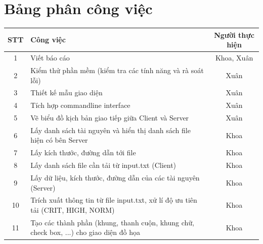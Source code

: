 \documentclass[a4paper,12pt]{report}
\begin{document}
\section{Bảng phân công việc}
\begin{center}
  \renewcommand{\arraystretch}{1.5}
  \begin{tabular}{|c|p{}|c|}
    \hline
    \textbf{STT} & \textbf{Công việc}                                                                                         & \textbf{Người thực hiện} \\\hline
    1            & Viết báo cáo                                                                             & Khoa, Xuân               \\\hline
    2            & Kiểm thử phần mềm (kiểm tra các tính năng và rà soát lỗi)                                     & Xuân               \\\hline
    3            & Thiết kế mẫu giao diện                                                                         & Xuân               \\\hline
    4            & Tích hợp commandline interface                                                                & Xuân               \\\hline
    5            & Vẽ biểu đồ kịch bản giao tiếp giữa Client và Server                                                & Xuân               \\\hline
    6            & Lấy danh sách tài nguyên và hiển thị danh sách file hiện có bên Server       & Khoa             \\\hline
    7            & Lấy kích thước, đường dẫn tới file                                                                       & Khoa             \\\hline
    8            & Lấy danh sách file cần tải từ input.txt (Client)                                             & Khoa             \\\hline
    9            & Lấy dữ liệu, kích thước, đường dẫn của các tài nguyên (Server)                                       & Khoa             \\\hline
    10           & Trích xuất thông tin từ file input.txt, xử lí độ ưu tiên tải (CRIT, HIGH, NORM)                                    & Khoa             \\\hline
    11           & Tạo các thành phần (khung, thanh cuộn, khung chữ, check box, ...) cho giao diện đồ họa                               & Khoa             \\\hline

\end{tabular}
\end{center}
\end{document}
